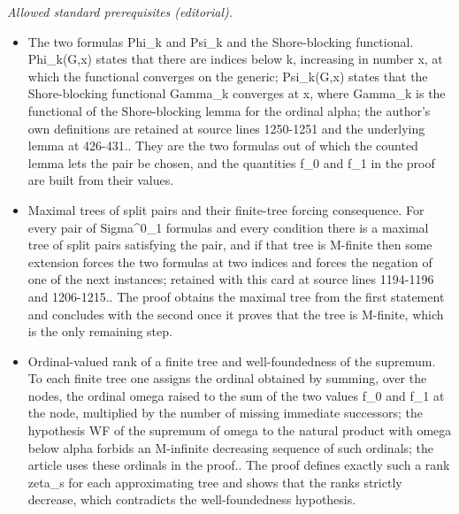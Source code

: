 \documentclass{article}
\numberwithin{theorem}{section}
\newtheorem{lemma}[theorem]{Lemma}
\newcommand{\RCA}{\mathsf{RCA}}
\newcommand{\M}{\mathcal{M}}
\newcommand{\ntimes}{\dottimes}
\begin{document}
\noindent\textit{Allowed standard prerequisites (editorial).}\begin{itemize}
\item The two formulas Phi\_k and Psi\_k and the Shore-blocking functional. Phi\_k(G,x) states that there are indices below k, increasing in number x, at which the functional converges on the generic; Psi\_k(G,x) states that the Shore-blocking functional Gamma\_k converges at x, where Gamma\_k is the functional of the Shore-blocking lemma for the ordinal alpha; the author's own definitions are retained at source lines 1250-1251 and the underlying lemma at 426-431.. They are the two formulas out of which the counted lemma lets the pair be chosen, and the quantities f\_0 and f\_1 in the proof are built from their values.
\item Maximal trees of split pairs and their finite-tree forcing consequence. For every pair of Sigma\textasciicircum{}0\_1 formulas and every condition there is a maximal tree of split pairs satisfying the pair, and if that tree is M-finite then some extension forces the two formulas at two indices and forces the negation of one of the next instances; retained with this card at source lines 1194-1196 and 1206-1215.. The proof obtains the maximal tree from the first statement and concludes with the second once it proves that the tree is M-finite, which is the only remaining step.
\item Ordinal-valued rank of a finite tree and well-foundedness of the supremum. To each finite tree one assigns the ordinal obtained by summing, over the nodes, the ordinal omega raised to the sum of the two values f\_0 and f\_1 at the node, multiplied by the number of missing immediate successors; the hypothesis WF of the supremum of omega to the natural product with omega below alpha forbids an M-infinite decreasing sequence of such ordinals; the article uses these ordinals in the proof.. The proof defines exactly such a rank zeta\_s for each approximating tree and shows that the ranks strictly decrease, which contradicts the well-foundedness hypothesis.
\end{itemize}\medskip
{}
\end{document}
